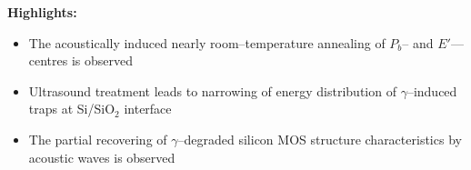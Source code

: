 \documentclass[preprint]{elsarticle}
\begin{document}
\textbf{Highlights:}

\begin{itemize}
  \item The acoustically induced nearly room--temperature annealing of
      $P_b$-- and $E'$---centres is observed
  \item Ultrasound treatment leads to narrowing of energy distribution of $\gamma$--induced traps at Si/SiO$_2$  interface
  \item The partial recovering of $\gamma$--degraded silicon MOS structure characteristics by acoustic waves is observed
\end{itemize}
\end{document}
